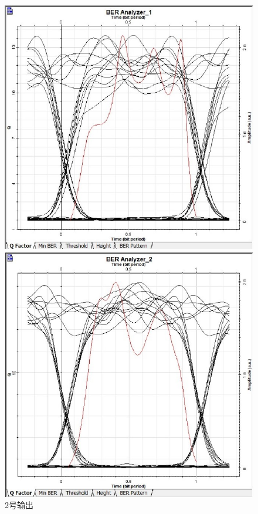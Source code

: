 \documentclass[12pt, a4paper, oneside]{article}
\begin{document}
\begin{spacing}{2.0}
\begin{figure}[H]
\begin{minipage}[t]{0.5\linewidth}
        \centering
        \includegraphics[scale=0.5]{Q-factor (2).jpg}
        \caption{2号输出}
        \label{fig:side:b}
      \end{minipage}
	  \begin{minipage}[t]{0.5\linewidth}
        \centering
        \includegraphics[scale=0.5]{Q-factor (3).jpg}

\end{minipage}
\end{figure}
\end{spacing}
\end{document}
